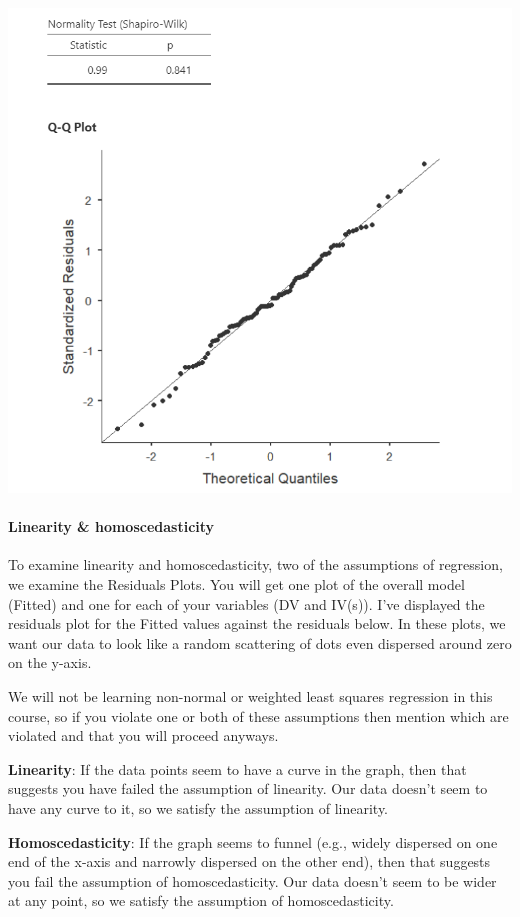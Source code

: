 \documentclass[
]{book}
\begin{document}
\includegraphics{images/13-regression/regression-normality.png}

\hypertarget{linearity-homoscedasticity}{%
\paragraph{Linearity \& homoscedasticity}\label{linearity-homoscedasticity}}

To examine linearity and homoscedasticity, two of the assumptions of regression, we examine the Residuals Plots. You will get one plot of the overall model (Fitted) and one for each of your variables (DV and IV(s)). I've displayed the residuals plot for the Fitted values against the residuals below. In these plots, we want our data to look like a random scattering of dots even dispersed around zero on the y-axis.

We will not be learning non-normal or weighted least squares regression in this course, so if you violate one or both of these assumptions then mention which are violated and that you will proceed anyways.

\textbf{Linearity}: If the data points seem to have a curve in the graph, then that suggests you have failed the assumption of linearity. Our data doesn't seem to have any curve to it, so we satisfy the assumption of linearity.

\textbf{Homoscedasticity}: If the graph seems to funnel (e.g., widely dispersed on one end of the x-axis and narrowly dispersed on the other end), then that suggests you fail the assumption of homoscedasticity. Our data doesn't seem to be wider at any point, so we satisfy the assumption of homoscedasticity.
\end{document}
